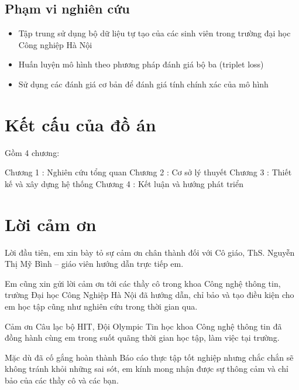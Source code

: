 \subsection{Phạm vi nghiên cứu}
\begin{itemize}
    \item Tập trung sử dụng bộ dữ liệu tự tạo của các sinh viên trong trường đại học Công nghiệp Hà Nội
    \item Huấn luyện mô hình theo phương pháp đánh giá bộ ba (triplet loss)
    \item Sử dụng các đánh giá cơ bản để đánh giá tính chính xác của mô hình
\end{itemize}

\newpage
\section{Kết cấu của đồ án}
Gồm 4 chương:

Chương 1 : Nghiên cứu tổng quan
Chương 2 : Cơ sở lý thuyết
Chương 3 : Thiết kế và xây dựng hệ thống
Chương 4 : Kết luận và hướng phát triển


\section{Lời cảm ơn}

Lời đầu tiên, em xin bày tỏ sự cảm ơn chân thành đối với Cô giáo, ThS.
Nguyễn Thị Mỹ Bình – giáo viên hướng dẫn trực tiếp em.

Em cũng xin gửi lời cảm ơn tới các thầy cô trong khoa Công nghệ thông tin,
trường Đại học Công Nghiệp Hà Nội đã hướng dẫn, chỉ bảo và tạo điều kiện cho em
học tập cũng như nghiên cứu trong thời gian qua.

Cảm ơn Câu lạc bộ HIT, Đội Olympic Tin học khoa Công nghệ thông tin đã đồng hành
cùng em trong suốt quãng thời gian học tập, làm việc tại trường.

Mặc dù đã cố gắng hoàn thành Báo cáo thực tập tốt nghiệp nhưng chắc chắn
sẽ không tránh khỏi những sai sót, em kính mong nhận được sự thông cảm và chỉ
bảo của các thầy cô và các bạn.


